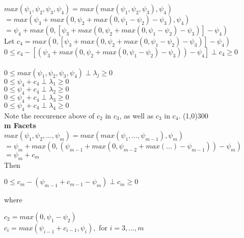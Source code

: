 \documentclass{article}
\begin{document}
$max(\psi_1,\psi_2,\psi_3, \psi_4) = max(max(\psi_1,\psi_2,\psi_3), \psi_4)$ \\
$= max(\psi_3 + max(0, \psi_2 + max(0,\psi_1 - \psi_2)-\psi_3), \psi_4)$  \\
$= \psi_4 + max(0, [\psi_3 + max(0, \psi_2 + max(0,\psi_1 - \psi_2)-\psi_3)]- \psi_4)$ \\
Let $c_4 = max(0, [\psi_3 + max(0,\psi_2 + max(0,\psi_1 - \psi_2)-\psi_3)]-\psi_4)$  \\
$0 \leq c_4 - [(\psi_3 + max(0, \psi_2 + max(0,\psi_1-\psi_2)-\psi_3)) -\psi_4] \perp c_4 \geq 0 $ \\ \\
$0 \leq max(\psi_1,\psi_2,\psi_3,\psi_4) \perp \lambda_j \geq 0 $ \\
$0 \leq \psi_4 + c_4 \perp \lambda_1 \geq 0$ \\
$0 \leq \psi_4 + c_4 \perp \lambda_2 \geq 0$ \\
$0 \leq \psi_4 + c_4 \perp \lambda_3 \geq 0$ \\
$0 \leq \psi_4 + c_4 \perp \lambda_4 \geq 0$ \\

Note the reccurence above of $c_2$ in $c_3$, as well as $c_3$ in $c_4$.
\newpage  
\line(1,0){300} \\ \textbf{m Facets} \\
$max(\psi_1,\psi_2,...,\psi_m) = max(max(\psi_1,...,\psi_{m-1}),\psi_m)$ \\
$= \psi_m + max(0,(\psi_{m-1}+ max(0,\psi_{m-2} + max( ... )-\psi_{m-1}))-\psi_m)$ \\
$= \psi_m + c_m$ \\ Then
\begin{center}
$ 0 \leq c_m - (\psi_{m-1} + c_{m-1} - \psi_m) \perp c_m \geq 0 $ 
\end{center}
where 
\begin{center}
$ c_2= max(0,\psi_1-\psi_2)$ \\ $c_i = max(\psi_{i-1} + c_{i-1}, \psi_i), $ for $i=3,...,m $
\end{center}
\end{document}
